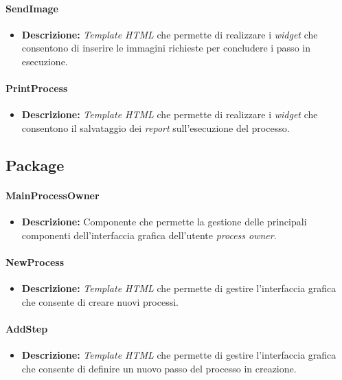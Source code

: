 \paragraph{SendImage}
\label{sendImageTemplate}
\begin{itemize}
\item \textbf{Descrizione:} \textit{Template HTML} che permette di realizzare i \textit{widget} che consentono di inserire le immagini richieste per concludere i passo in esecuzione.
\end{itemize}

\paragraph{PrintProcess}
\label{printProcessTemplate}
\begin{itemize}
\item \textbf{Descrizione:} \textit{Template HTML} che permette di realizzare i \textit{widget} che consentono il salvataggio dei \textit{report} sull'esecuzione del processo.
\end{itemize}

\subsection{Package \viewAdmin{}}

\paragraph{MainProcessOwner}
\label{mainProcessOwnerTemplate}
\begin{itemize}
\item \textbf{Descrizione:} Componente che permette la gestione delle principali componenti dell'interfaccia grafica dell'utente \textit{process owner}.
\end{itemize}

\paragraph{NewProcess}
\label{newProcessTemplate}
\begin{itemize}
\item \textbf{Descrizione:} \textit{Template HTML} che permette di gestire l'interfaccia grafica che consente di creare nuovi processi.
\end{itemize}

\paragraph{AddStep}
\label{AddStepTemplate}
\begin{itemize}
\item \textbf{Descrizione:} \textit{Template HTML} che permette di gestire l'interfaccia grafica che consente di definire un nuovo passo del processo in creazione.
\end{itemize}

